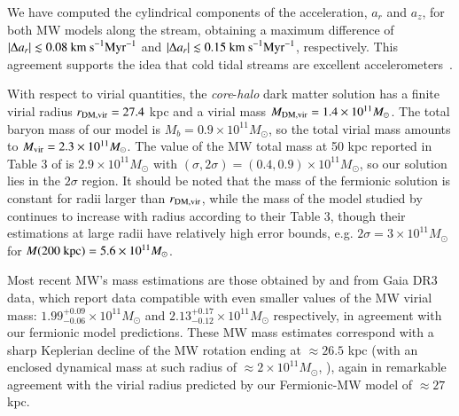 \documentclass[twocolumn]{aa}
\begin{document}
We have computed the cylindrical components of the acceleration, $a_r$ and $a_z$,
for both MW models along the stream, obtaining a maximum difference of $|\Delta a_r| \lesssim 0.08 \rm{~km~s}^{-1} \rm{Myr}^{-1}$ and $|\Delta a_r| \lesssim 0.15 \rm{~km~s}^{-1} \rm{Myr}^{-1}$, respectively. This agreement supports  the idea that cold tidal streams are excellent accelerometers~\citep{Ibata_2016,2022ApJ...940...22N,2023ApJ...945L..32C}.

With respect to virial quantities, the \textit{core}-\textit{halo} dark matter solution has a finite virial radius $r_{\rm{DM,vir}}=27.4$ kpc and a virial mass
$M_{\rm{DM,vir}}=1.4\times10^{11} M_\odot$. The total baryon mass of our model is $M_b=0.9\times10^{11}M_\odot$, so the total virial mass amounts to
$M_{\rm{vir}}=2.3\times10^{11} M_\odot$. The value of the MW total mass at 50 kpc reported in Table 3
of \citet{2014MNRAS.445.3788G} is $2.9\times10^{11} M_\odot$ with $(\sigma, 2\sigma)=(0.4,0.9)\times10^{11} M_\odot$, so our solution lies in the $2\sigma$ region.
It should be noted that the mass of the fermionic solution is constant for radii larger than
$r_{\rm{DM,vir}}$, while the mass of the model studied by \citet{2014MNRAS.445.3788G} continues to increase with radius according to their Table 3, though their estimations at large radii have relatively
high error bounds, e.g. $2\sigma=3\times10^{11} M_\odot$ for $M(200 \hbox{ kpc}) =5.6\times10^{11} M_\odot$.

Most recent MW's mass estimations are those obtained by
\citet{Jiao2023} and \citet{Ou2023} from Gaia DR3 data, which report data compatible with even smaller values of the MW virial mass: $1.99^{+0.09}_{-0.06}\times10^{11} M_\odot$ and $2.13^{+0.17}_{-0.12}\times10^{11} M_\odot$ respectively, in agreement with our fermionic model predictions. These MW mass estimates correspond with a sharp Keplerian decline of the MW rotation ending at $\approx 26.5$ kpc (with an enclosed dynamical mass at such radius of $\approx 2\times 10^{11} M_\odot$, \citealp{Jiao2023}), again in remarkable agreement with the virial radius predicted by our Fermionic-MW model of $\approx 27$ kpc. 
\end{document}

